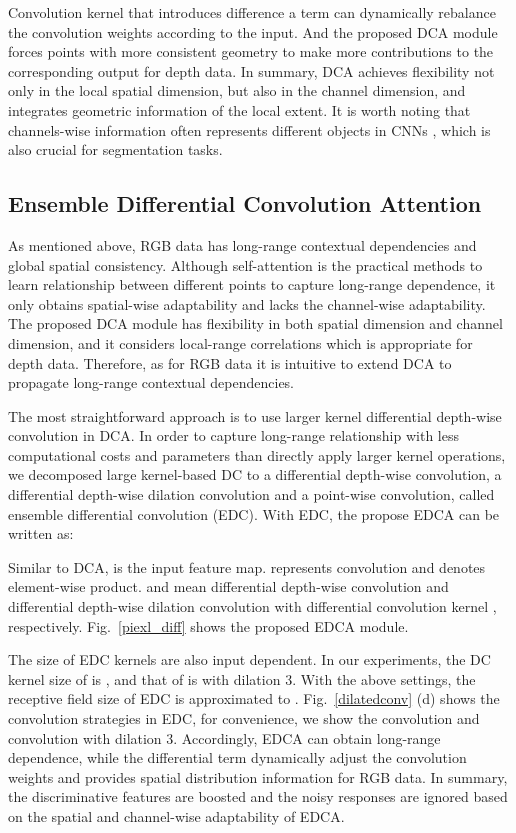 \documentclass[10pt,twocolumn,letterpaper]{article}
\begin{document}
Convolution kernel that introduces difference a term can dynamically rebalance the convolution weights according to the input.
And the proposed DCA module forces points with more consistent geometry to make more contributions to the corresponding output for depth data.
In summary, DCA achieves flexibility not only in the local spatial dimension, but also in the channel dimension, and integrates
geometric information of the local extent. It is worth noting that channels-wise information often represents different objects in CNNs
\cite{qin2020ffa,chen2017sca}, which is also crucial for segmentation tasks.



\subsection{Ensemble Differential Convolution Attention}
As mentioned above, RGB data has long-range contextual dependencies and global spatial consistency.
Although self-attention \cite{wang2018non,zhu2019asymmetric,zhang2019self} is the practical methods to learn relationship
between different points to capture long-range dependence, it only obtains spatial-wise adaptability
and lacks the channel-wise adaptability. The proposed
DCA module has flexibility in both spatial dimension and channel dimension, and it considers local-range
correlations which is appropriate for depth data. Therefore, as for RGB data it is intuitive to extend DCA to propagate long-range contextual
dependencies.

The most straightforward approach is to use larger kernel differential depth-wise convolution in DCA. In order to capture long-range relationship with less
computational costs and parameters than directly apply larger
kernel operations, we decomposed large kernel-based DC to a differential depth-wise convolution, a differential
depth-wise dilation convolution and a point-wise convolution, called ensemble differential convolution (EDC). With EDC, the
propose EDCA can be written as:

Similar to DCA,  is the input feature map.  represents
 convolution and  denotes element-wise product.  and 
mean differential depth-wise convolution and differential depth-wise dilation convolution with differential convolution kernel
, respectively. Fig.~\ref{piexl_diff} shows the proposed EDCA module.

The size of EDC kernels are also input dependent. In our experiments, the DC kernel size of
 is , and that of  is  with dilation 3. With the above
settings, the receptive field size of EDC is approximated to .
Fig.~\ref{dilatedconv} (d) shows the convolution strategies in EDC, for convenience, we show the  convolution and  convolution
with dilation 3. Accordingly,
EDCA can obtain long-range dependence, while the differential term dynamically adjust the convolution weights and
provides spatial distribution information for RGB data. In summary, the discriminative features are boosted and the noisy
responses are ignored based on the spatial and channel-wise adaptability of EDCA.
\end{document}
